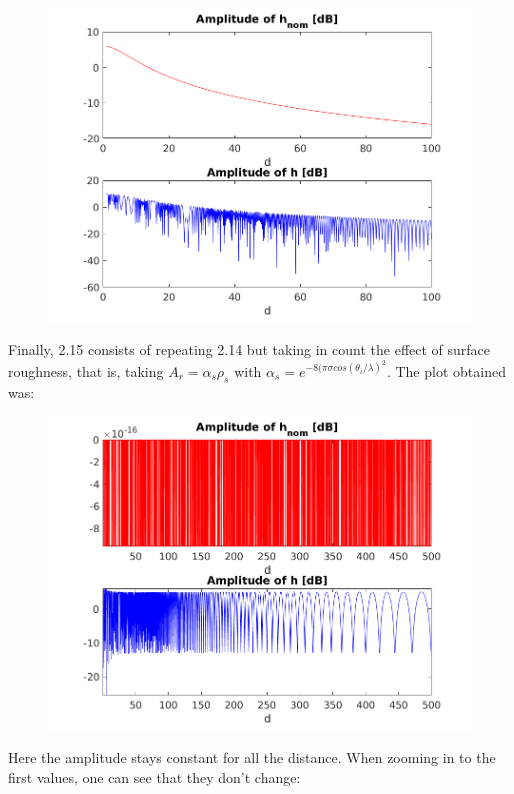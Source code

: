 \documentclass[a4paper,11pt]{article}
\begin{document}
\begin{figure}[!ht]
	\centering
	\includegraphics[scale = 0.85]{images/2_14b.png}
\end{figure}

Finally, 2.15 consists of repeating 2.14 but taking in count the effect of
surface roughness, that is, taking $A_r = \alpha_{s}\rho_s$ with
$\alpha_{s} = e^{-8(\pi \sigma cos(\theta_{i}/\lambda)^2}$. The plot obtained was:

\begin{figure}[!ht]
	\centering
	\includegraphics[scale = 0.85]{images/2_15a.png}
\end{figure}

\newpage

Here the amplitude stays constant for all the distance. When zooming in to the
first values, one can see that they don't change:
\end{document}
